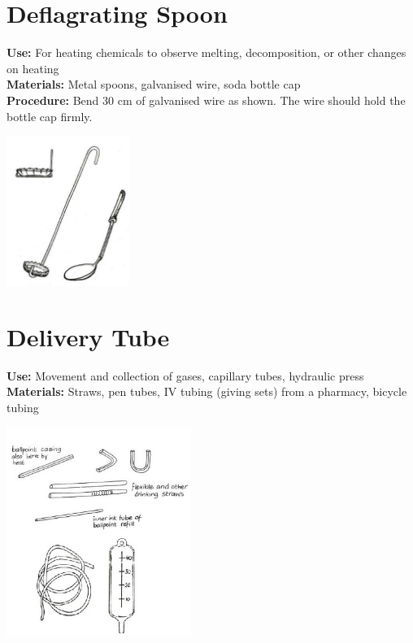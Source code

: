 \begin{multicols}{2}
\section{Deflagrating Spoon}
\label{sec:deflagratingspoon}
\vspace{-10pt}
\textbf{Use:} For heating chemicals to observe melting, decomposition, or other changes on heating\\
\textbf{Materials:} Metal spoons, galvanised wire, soda bottle cap\\
\textbf{Procedure:} Bend 30 cm of galvanised wire as shown. The wire should hold the bottle cap firmly.
\begin{center}
\includegraphics[width=0.3\textwidth]{./img/source/deflagrating-spoon.jpg}
\end{center}

\section{Delivery Tube}
\label{sec:delivery-tube}
\vspace{-10pt}
\textbf{Use:} Movement and collection of gases, capillary tubes, hydraulic press\\
\textbf{Materials:} Straws, pen tubes, IV tubing (giving sets) from a pharmacy, bicycle tubing
\begin{center}
\includegraphics[width=0.45\textwidth]{./img/vso/tubes.jpg}
\end{center}


\end{multicols}
